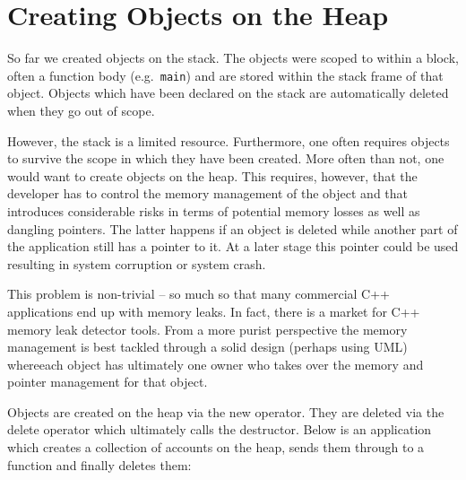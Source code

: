 \section{Creating Objects on the Heap}

So far we created objects on the stack. The objects were
scoped to within a block, often a function body (e.g.\ \verb+main+) and
are stored within the stack frame of that object. Objects
which have been declared on the stack are automatically 
deleted when they go out of scope.

However, the stack is a limited resource. Furthermore, one often requires
objects to survive the scope in which they have been created. More often
than not, one would want to create objects on the heap. This requires,
however, that the developer has to control the memory management of the
object and that introduces considerable risks in terms of potential
memory losses as well as dangling pointers. The latter happens if an
object is deleted while another part of the application still has a
pointer to it. At a later stage this pointer could be used resulting
in system corruption or system crash.

This problem is non-trivial -- so much so that many commercial C++ applications
end up with memory leaks. In fact, there is a market for C++ memory leak 
detector tools. From a more purist perspective the memory management is best
tackled through a solid design (perhaps using UML) whereeach object has 
ultimately one owner who takes over the memory and pointer management for
that object.

Objects are created on the heap via the new operator. They are deleted via
the delete operator which ultimately calls the destructor. Below is an
application which creates a collection of accounts on the heap, sends them 
through to a function and finally deletes them:

\noindent {\small }


